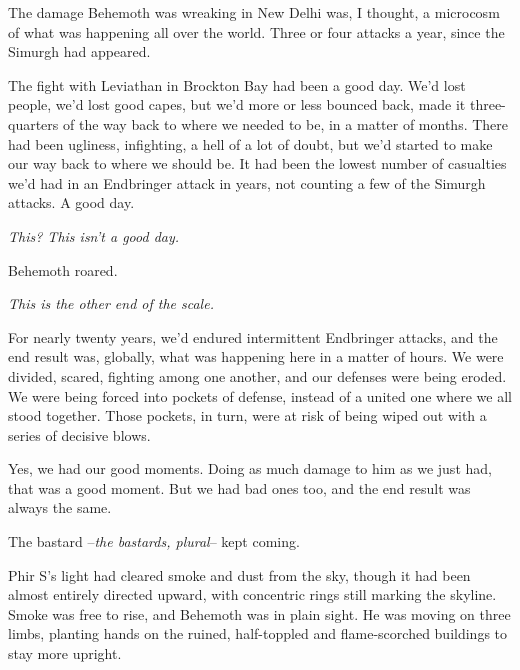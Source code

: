 





The damage Behemoth was wreaking in New Delhi was, I thought, a microcosm of what was happening all over the world.  Three or four attacks a year, since the Simurgh had appeared.



The fight with Leviathan in Brockton Bay had been a good day.  We'd lost people, we'd lost good capes, but we'd more or less bounced back, made it three-quarters of the way back to where we needed to be, in a matter of months.  There had been ugliness, infighting, a hell of a lot of doubt, but we'd started to make our way back to where we should be.  It had been the lowest number of casualties we'd had in an Endbringer attack in years, not counting a few of the Simurgh attacks.  A good day.



\emph{This?  This isn't a good day. }



Behemoth roared.



\emph{This is the other end of the scale.}



For nearly twenty years, we'd endured intermittent Endbringer attacks, and the end result was, globally, what was happening here in a matter of hours.  We were divided, scared, fighting among one another, and our defenses were being eroded.  We were being forced into pockets of defense, instead of a united one where we all stood together.  Those pockets, in turn, were at risk of being wiped out with a series of decisive blows.



Yes, we had our good moments.  Doing as much damage to him as we just had, that was a good moment.  But we had bad ones too, and the end result was always the same.



The bastard –\emph{the bastards, plural}– kept coming.



Phir S's light had cleared smoke and dust from the sky, though it had been almost entirely directed upward, with concentric rings still marking the skyline.  Smoke was free to rise, and Behemoth was in plain sight.  He was moving on three limbs, planting hands on the ruined, half-toppled and flame-scorched buildings to stay more upright.



